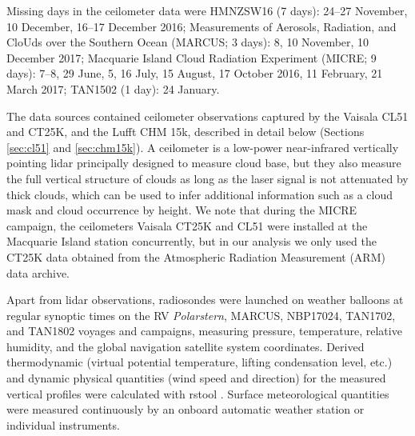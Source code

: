 \documentclass[12pt,a4paper]{article}
\begin{document}
Missing days in the ceilometer data were HMNZSW16 (7 days): 24--27 November, 10
December, 16--17 December 2016; Measurements of Aerosols, Radiation, and CloUds
over the Southern Ocean (MARCUS;  3 days): 8, 10 November, 10 December 2017;
Macquarie Island Cloud Radiation Experiment (MICRE; 9 days): 7--8, 29 June, 5,
16 July, 15 August, 17 October 2016, 11 February, 21 March 2017; TAN1502 (1
day): 24 January.

The data sources contained ceilometer observations captured by the Vaisala CL51
and CT25K, and the Lufft CHM 15k, described in detail below (Sections
\ref{sec:cl51} and \ref{sec:chm15k}). A ceilometer is a low-power near-infrared
vertically pointing lidar principally designed to  measure cloud base, but they
also measure the full vertical structure of clouds as long as the laser signal
is not attenuated by thick clouds, which can be used to infer additional
information such as a cloud mask and cloud occurrence by height.  We note that
during the MICRE campaign, the ceilometers Vaisala CT25K and CL51 were
installed at the Macquarie Island station concurrently, but in our analysis we
only used the CT25K data obtained from the Atmospheric Radiation Measurement
(ARM) data archive.

Apart from lidar observations, radiosondes were launched on weather balloons at
regular synoptic times on the RV \emph{Polarstern}, MARCUS, NBP17024, TAN1702,
and TAN1802 voyages and campaigns, measuring pressure, temperature, relative
humidity, and the global navigation satellite system coordinates. Derived
thermodynamic (virtual potential temperature, lifting condensation level, etc.)
and dynamic physical quantities (wind speed and direction) for the measured
vertical profiles were calculated with rstool \citep{rstool}. Surface
meteorological quantities were measured continuously by an onboard automatic
weather station or individual instruments.
\end{document}
